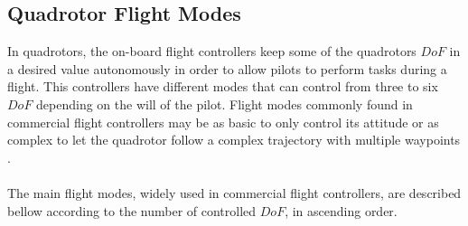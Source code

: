 \subsection{Quadrotor Flight Modes}
In quadrotors, the on-board flight controllers keep some of the quadrotors $DoF$ in a desired value autonomously in order to allow pilots to perform tasks during a flight. This controllers have different modes that can control from three to six $DoF$ depending on the will of the pilot. Flight modes commonly found in commercial flight controllers may be as basic to only control its attitude or as complex to let the quadrotor follow a complex trajectory with multiple waypoints \cite{Ardupilot2016}.
\\\\
The main flight modes, widely used in commercial flight controllers, are described bellow according to the number of controlled $DoF$, in ascending order.

